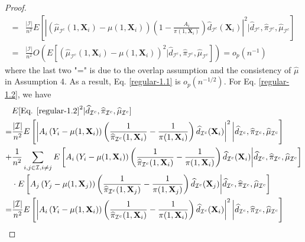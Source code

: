 \documentclass[11pt]{article}
\theoremstyle{referenceplain}
\theoremstyle{referencedefinition}
\theoremstyle{referenceremark}
\begin{document}
\begin{proof}
\begin{align*}
       =&\frac{|\mathcal{I}|}{n^2} E\left[\left|\left(\widehat{\mu}_{\mathcal{I}^c}(1,\mathbf{X}_i)-\mu(1,\mathbf{X}_i)\right)\left(1-\frac{A_i}{\pi(1,\mathbf{X}_i)}\right)\widehat{d}_{\mathcal{I}^c}(\mathbf{X}_i)\right|^2\bigg|\widehat{d}_{\mathcal{I}^c}, \widehat{\pi}_{\mathcal{I}^c}, \widehat{\mu}_{\mathcal{I}^c}\right]\\
       =&\frac{|\mathcal{I}|}{n^2} O\left(E\left[\left(\widehat{\mu}_{\mathcal{I}^c}(1,\mathbf{X}_i)-\mu(1,\mathbf{X}_i)\right)^2\bigg|\widehat{d}_{\mathcal{I}^c}, \widehat{\pi}_{\mathcal{I}^c}, \widehat{\mu}_{\mathcal{I}^c}\right]\right)=o_p(n^{-1})
    \end{align*}
    where the last two "=" is due to the overlap assumption and the consistency of $\widehat{\mu}$ in Assumption 4. As a result, Eq. \eqref{regular-1.1} is $o_p(n^{-1/2})$. For Eq. \eqref{regular-1.2}, we have
    \begin{align*}
        & E[\text{Eq. }\eqref{regular-1.2}^2|\widehat{d}_{\mathcal{I}^c}, \widehat{\pi}_{\mathcal{I}^c}, \widehat{\mu}_{\mathcal{I}^c}]\\
        =&\frac{|\mathcal{I}|}{n^2} E\left[\left|A_i\left(Y_i-\mu(1,\mathbf{X}_i)\right)\left(\frac{1}{\widehat{\pi}_{\mathcal{I}^c}(1,\mathbf{X}_i)}-\frac{1}{\pi(1,\mathbf{X}_i)}\right)\widehat{d}_{\mathcal{I}^c}(\mathbf{X}_i)\right|^2\bigg|\widehat{d}_{\mathcal{I}^c}, \widehat{\pi}_{\mathcal{I}^c}, \widehat{\mu}_{\mathcal{I}^c}\right]\\
       +&\frac{1}{n^2}\sum_{i,j\in\mathcal{I},i\neq j}E\left[A_i\left(Y_i-\mu(1,\mathbf{X}_i)\right)\left(\frac{1}{\widehat{\pi}_{\mathcal{I}^c}(1,\mathbf{X}_i)}-\frac{1}{\pi(1,\mathbf{X}_i)}\right)\widehat{d}_{\mathcal{I}^c}(\mathbf{X}_i)\bigg|\widehat{d}_{\mathcal{I}^c}, \widehat{\pi}_{\mathcal{I}^c}, \widehat{\mu}_{\mathcal{I}^c}\right]\\
       &\cdot E\left[A_j\left(Y_j-\mu(1,\mathbf{X}_j)\right)\left(\frac{1}{\widehat{\pi}_{\mathcal{I}^c}(1,\mathbf{X}_j)}-\frac{1}{\pi(1,\mathbf{X}_j)}\right)\widehat{d}_{\mathcal{I}^c}(\mathbf{X}_j)\bigg|\widehat{d}_{\mathcal{I}^c}, \widehat{\pi}_{\mathcal{I}^c}, \widehat{\mu}_{\mathcal{I}^c}\right]\\
       =&\frac{|\mathcal{I}|}{n^2} E\left[\left|A_i\left(Y_i-\mu(1,\mathbf{X}_i)\right)\left(\frac{1}{\widehat{\pi}_{\mathcal{I}^c}(1,\mathbf{X}_i)}-\frac{1}{\pi(1,\mathbf{X}_i)}\right)\widehat{d}_{\mathcal{I}^c}(\mathbf{X}_i)\right|^2\bigg|\widehat{d}_{\mathcal{I}^c}, \widehat{\pi}_{\mathcal{I}^c}, \widehat{\mu}_{\mathcal{I}^c}\right]\\

\end{align*}
\end{proof}
\end{document}
